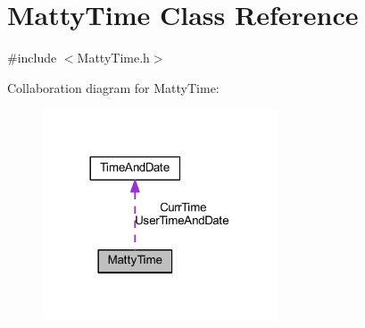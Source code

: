 \hypertarget{classMattyTime}{}\section{Matty\+Time Class Reference}
\label{classMattyTime}


{\ttfamily \#include $<$Matty\+Time.\+h$>$}



Collaboration diagram for Matty\+Time\+:
\nopagebreak
\begin{figure}[H]
\begin{center}
\leavevmode
\includegraphics[width=197pt]{classMattyTime__coll__graph}
\end{center}
\end{figure}
